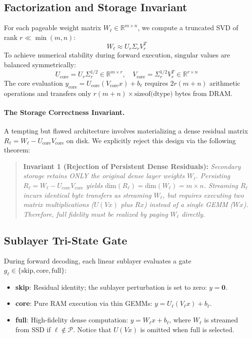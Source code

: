 \documentclass[11pt,a4paper]{article}
\begin{document}
\subsection{Factorization and Storage Invariant}
For each pageable weight matrix $W_\ell \in \mathbb{R}^{m \times n}$, we compute a truncated SVD of rank $r \ll \min(m, n)$:
\begin{equation}
    W_\ell \approx U_r \Sigma_r V_r^T
\end{equation}
To achieve numerical stability during forward execution, singular values are balanced symmetrically:
\begin{equation}
    U_{\text{core}} = U_r \Sigma_r^{1/2} \in \mathbb{R}^{m \times r}, \quad V_{\text{core}} = \Sigma_r^{1/2} V_r^T \in \mathbb{R}^{r \times n}
\end{equation}
The core evaluation $y_{\text{core}} = U_{\text{core}}(V_{\text{core}} x) + b_\ell$ requires $2r(m+n)$ arithmetic operations and transfers only $r(m+n) \times \text{sizeof(dtype)}$ bytes from DRAM.

\paragraph{The Storage Correctness Invariant.}
A tempting but flawed architecture involves materializing a dense residual matrix $R_\ell = W_\ell - U_{\text{core}} V_{\text{core}}$ on disk. We explicitly reject this design via the following theorem:
\begin{quote}
\textbf{Invariant 1 (Rejection of Persistent Dense Residuals):} \textit{Secondary storage retains ONLY the original dense layer weights $W_\ell$. Persisting $R_\ell = W_\ell - U_{\text{core}} V_{\text{core}}$ yields $\text{dim}(R_\ell) = \text{dim}(W_\ell) = m \times n$. Streaming $R_\ell$ incurs identical byte transfers as streaming $W_\ell$, but requires executing two matrix multiplications ($U(Vx)$ plus $Rx$) instead of a single GEMM ($Wx$). Therefore, full fidelity must be realized by paging $W_\ell$ directly.}
\end{quote}

\subsection{Sublayer Tri-State Gate}
During forward decoding, each linear sublayer evaluates a gate $g_\ell \in \{\text{skip}, \text{core}, \text{full}\}$:
\begin{itemize}
    \item \textbf{skip}: Residual identity; the sublayer perturbation is set to zero: $y = \mathbf{0}$.
    \item \textbf{core}: Pure RAM execution via thin GEMMs: $y = U_\ell(V_\ell x) + b_\ell$.
    \item \textbf{full}: High-fidelity dense computation: $y = W_\ell x + b_\ell$, where $W_\ell$ is streamed from SSD if $\ell \notin \mathcal{P}$. Notice that $U(Vx)$ is omitted when full is selected.
\end{itemize}
\end{document}
